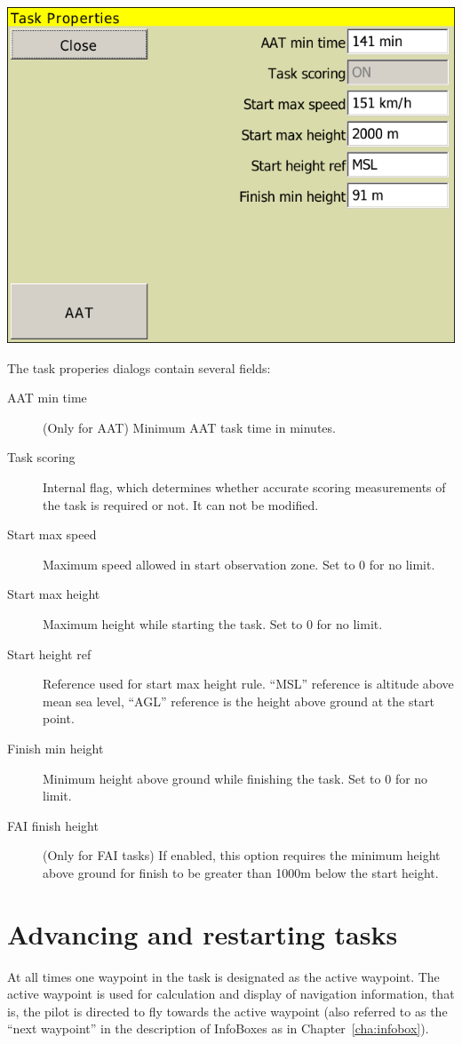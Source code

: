\documentclass[a4paper,12pt]{refrep}
\begin{document}
\begin{center}
\includegraphics[angle=0,width=0.8\linewidth,keepaspectratio='true']{figures/dialog-taskedit2.png}
\end{center}

The task properies dialogs contain several fields:
\begin{description}
\item[AAT min time]  (Only for AAT) Minimum AAT task time in minutes.
\item[Task scoring]  Internal flag, which determines whether accurate scoring
measurements of the task is required or not. It can not be modified.
\item[Start max speed]  Maximum speed allowed in start observation zone.  Set to
0 for no limit.
\item[Start max height]  Maximum height while starting the task.  Set to 0 for
no limit.
\item[Start height ref]  Reference used for start max height rule. ``MSL''
reference is altitude above mean sea level, ``AGL'' reference is the height
above ground at the start point.
\item[Finish min height]  Minimum height above ground while finishing the task. 
Set to 0 for no limit.
\item[FAI finish height]  (Only for FAI tasks) If enabled, this option requires
the minimum height above ground for finish to be greater than 1000m below the start height.
\end{description}

\section{Advancing and restarting tasks}\label{sec:advanc-rest-tasks}
At all times one waypoint in the task is designated as the active
waypoint.  The active waypoint is used for calculation and display of
navigation information, that is, the pilot is directed to fly towards
the active waypoint (also referred to as the ``next waypoint'' in the
description of InfoBoxes as in Chapter~\ref{cha:infobox}).
\end{document}
